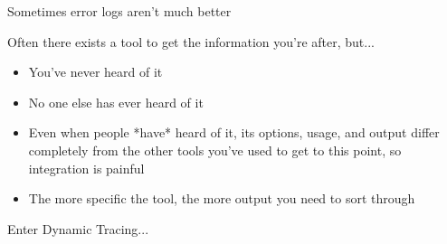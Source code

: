 \documentclass{beamer}
\begin{document}
\begin{frame}
    Sometimes error logs aren't much better
    \begin{figure}[b]
    \begin{centering}
    \end{centering}
    \end{figure}
\end{frame}

\begin{frame}
    Often there exists a tool to get the information you're after, but...
    \begin{itemize}
        \item<2->You've never heard of it
        \item<3->No one else has ever heard of it
        \item<4->Even when people *have* heard of it, its options, usage, and output differ completely from the other tools you've used to get to this point, so integration is painful
        \item<5->The more specific the tool, the more output you need to sort through
    \end{itemize}
\end{frame}

\begin{frame}
    Enter Dynamic Tracing...
\end{frame}
\end{document}
